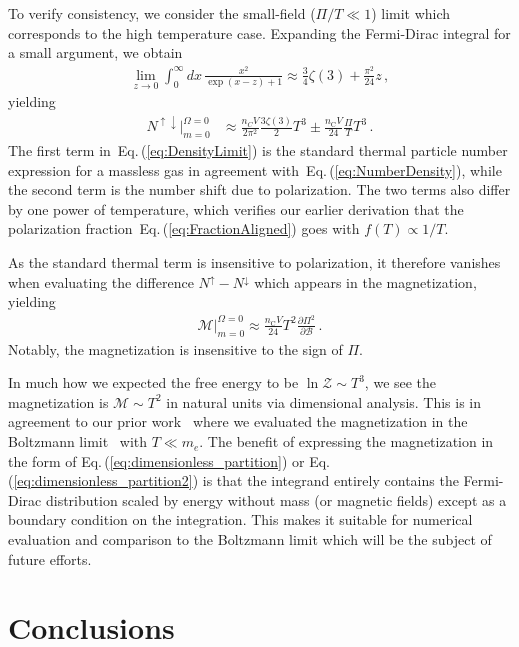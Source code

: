 \documentclass[epjST]{svjour}
\newcommand{\req}[1]{Eq.\,(\ref{#1})}
\begin{document}
{To verify consistency, we consider the small-field (\(\Pi/T\ll 1\)) limit which corresponds to the high temperature case. Expanding the Fermi-Dirac integral for a small argument, we obtain
\begin{align}
\lim_{z\to0}\int_{0}^{\infty} dx\,\frac{x^{2}}{\exp\left(x-z\right)+1} \approx \frac{3}{4}\zeta(3)+\frac{\pi^2}{24}z\,,
\end{align}
yielding
\begin{align}
\label{eq:DensityLimit}
N^{\uparrow\downarrow}\vert_{m=0}^{\Omega=0}  &\approx \frac{n_{C}V}{2\pi^{2}}\frac{3\zeta(3)}{2}T^3 \pm \frac{n_{\mathrm{C}}V}{24}\frac{\Pi}{T}T^3\,.
\end{align}
The first term in~\req{eq:DensityLimit} is the standard thermal particle number expression for a massless gas in agreement with~\req{eq:NumberDensity}, while the second term is the number shift due to polarization. The two terms also differ by one power of temperature, which verifies our earlier derivation that the polarization fraction~\req{eq:FractionAligned} goes with \(f(T)\propto1/T\).

As the standard thermal term is insensitive to polarization, it therefore vanishes when evaluating the difference \(N^{\uparrow}-N^{\downarrow}\) which appears in the magnetization, yielding
\begin{align}
\label{eq:FinalMag}
\mathcal{M}\vert_{m=0}^{\Omega=0} \approx \frac{n_\mathrm{C}V}{24}T^2\frac{\partial\Pi^2}{\partial\mathcal{B}}\,.
\end{align}
Notably, the magnetization is insensitive to the sign of \(\Pi\).} In much how we expected the free energy to be \(\ln\mathcal{Z}\sim T^{3}\), we see the magnetization is \(\mathcal{M}\sim T^{2}\) in natural units via dimensional analysis. This is in agreement to our prior work~\cite{Steinmetz:2023nsc,Steinmetz:2023ucp} where we evaluated the magnetization in the Boltzmann limit~\cite{Steinmetz:2023nsc} with \(T\ll m_e\). The benefit of expressing the magnetization in the form of \req{eq:dimensionless_partition} or \req{eq:dimensionless_partition2} is that the integrand entirely contains the Fermi-Dirac distribution scaled by energy without mass (or magnetic fields) except as a boundary condition on the integration. This makes it suitable for numerical evaluation and comparison to the Boltzmann limit which will be the subject of future efforts.

\section{Conclusions}
\label{sec:conclusions}
\end{document}
